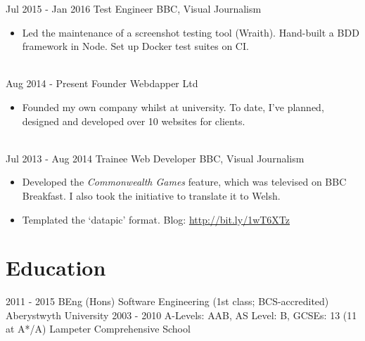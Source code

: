 \documentclass[letterpaper]{twentysecondcv} %
\begin{document}
\begin{twenty}
    \twentyitem
  		{Jul 2015 -}
		{Jan 2016}
        {Test Engineer}
        {BBC, Visual Journalism}
        {}
        {
        {\begin{itemize}
        \item Led the maintenance of a screenshot testing tool (Wraith). Hand-built a BDD framework in Node. Set up Docker test suites on CI.
    \end{itemize}}
        }
     \\
     \twentyitem
   		{Aug 2014 -}
		{Present}
        {Founder}
        {Webdapper Ltd}
        {}
        {
        \begin{itemize}
        \item Founded my own company whilst at university. To date, I've planned, designed and developed over 10 websites for clients.
    \end{itemize}
    	}
    \\
    \twentyitem
   		{Jul 2013 -}
		{Aug 2014}
        {Trainee Web Developer}
        {BBC, Visual Journalism}
        {}
        {
        {\begin{itemize}
        \item Developed the \emph{Commonwealth Games} feature, which was televised on BBC Breakfast. I also took the initiative to translate it to Welsh.
        \item Templated the ‘datapic’ format. Blog: \url{http://bit.ly/1wT6XTz}
    \end{itemize}}
        }

\end{twenty}

\section{Education}

\begin{twenty} %
	\twentyitem
    	{2011 - 2015}
        {}
        {BEng (Hons) Software Engineering \textnormal{(1st class; BCS-accredited)}}
        {}
        {Aberystwyth University}
        {}
	\twentyitem
    	{2003 - 2010}
		{}
        {A-Levels: \textnormal{AAB}, AS Level: \textnormal{B}, GCSEs: \textnormal{13 (11 at A*/A)}
        }
        {}
        {Lampeter Comprehensive School}
        {}
\end{twenty}
\end{document}
